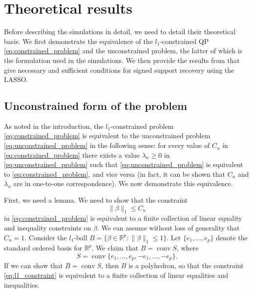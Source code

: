 \documentclass[letterpaper,12pt]{article}
\DeclareMathOperator{\conv}{conv}
\newcommand{\norm}[1]{\lVert#1\rVert}
\begin{document}
\section*{Theoretical results}

Before describing the simulations in detail, we need to detail their
theoretical basis. We first demonstrate the equivalence of the
$l_1$-constrained QP \eqref{eq:constrained_problem} and the
unconstrained problem, the latter of which is the formulation used in
the simulations. We then provide the results from \cite{wainwright06}
that give necessary and sufficient conditions for signed support
recovery using the LASSO.

\subsection*{Unconstrained form of the problem}

As noted in the introduction, the $l_1$-constrained problem
\eqref{eq:constrained_problem} is equivalent to the unconstrained
problem \eqref{eq:unconstrained_problem} in the following sense: for
every value of $C_n$ in \eqref{eq:constrained_problem} there exists a
value $\lambda_n \geq 0$ in \eqref{eq:unconstrained_problem} such that
\eqref{eq:unconstrained_problem} is equivalent to
\eqref{eq:constrained_problem}, and vice versa (in fact, it can be
shown that $C_n$ and $\lambda_n$ are in one-to-one correspondence). We
now demonstrate this equivalence.

First, we need a lemma. We need to show that the constraint
\begin{equation} \label{eq:l1_constraint}
  \norm{\beta}_1 \leq C_n
\end{equation}
in \eqref{eq:constrained_problem} is equivalent to a finite collection
of linear equality and inequality constraints on $\beta$. We can
assume without loss of generality that $C_n = 1$. Consider the
$l_1$-ball $B = \{\beta \in \mathbb{R}^p : \norm{\beta}_1 \leq
1\}$. Let $\{e_1, \ldots, e_p\}$ denote the standard ordered basis for
$\mathbb{R}^p$. We claim that $B = \conv S$, where
\begin{equation*}
  S = \conv\{e_1, \ldots, e_p, -e_1, \ldots, -e_p\}.
\end{equation*}
If we can show that $B = \conv S$, then $B$ is a polyhedron, so that
the constraint \eqref{eq:l1_constraint} is equivalent to a finite
collection of linear equalities and inequalities.
\end{document}
